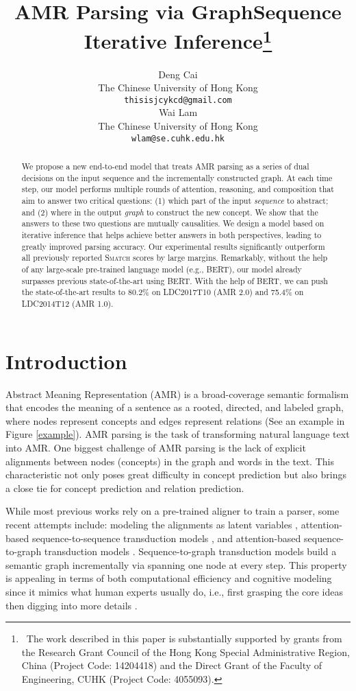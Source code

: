 \documentclass[11pt,a4paper]{article}
\title{AMR Parsing via Graph{\small }Sequence Iterative Inference\thanks{~The work described in this paper is substantially supported by grants from the Research Grant Council of the Hong Kong Special Administrative Region, China (Project Code: 14204418) and the Direct Grant of the Faculty of Engineering, CUHK (Project Code: 4055093).}}
\author{Deng Cai \\
	The Chinese University of Hong Kong\\
	{\tt thisisjcykcd@gmail.com} \\\And
	Wai Lam \\
	The Chinese University of Hong Kong\\
	{\tt wlam@se.cuhk.edu.hk} \\}
\date{}
\begin{document}
	\maketitle
	\begin{abstract}
		We propose a new end-to-end model that treats AMR parsing as a series of dual decisions on the input sequence and the incrementally constructed graph. At each time step, our model performs multiple rounds of attention, reasoning, and composition that aim to answer two critical questions: (1) which part of the input \textit{sequence} to abstract; and (2) where in the output \textit{graph} to construct the new concept. We show that the answers to these two questions are mutually causalities. We design a model based on iterative inference that helps achieve better answers in both perspectives, leading to greatly improved parsing accuracy. Our experimental results significantly outperform all previously reported \textsc{Smatch} scores by large margins. Remarkably, without the help of any large-scale pre-trained language model (e.g., BERT), our model already surpasses previous state-of-the-art using BERT. With the help of BERT, we can push the state-of-the-art results to 80.2\% on LDC2017T10 (AMR 2.0) and 75.4\% on LDC2014T12 (AMR 1.0).
	\end{abstract}
	\section{Introduction}
	Abstract Meaning Representation (AMR) \cite{banarescu2013abstract} is a broad-coverage semantic formalism that encodes the meaning of a sentence as a rooted, directed, and labeled graph, where nodes represent concepts and edges represent relations (See an example in Figure \ref{example}). AMR parsing is the task of transforming natural language text into AMR. One biggest challenge of AMR parsing is the lack of explicit alignments between nodes (concepts) in the graph and words in the text. This characteristic not only poses great difficulty in concept prediction but also brings a close tie for concept prediction and relation prediction.
	
	While most previous works rely on a pre-trained aligner to train a parser, some recent attempts include: modeling the alignments as latent variables \cite{lyu2018amr}, attention-based sequence-to-sequence transduction models \cite{barzdins2016riga,konstas2017neural,van2017neural}, and attention-based sequence-to-graph transduction models \cite{cai-lam-2019-core,zhang-etal-2019-broad}. Sequence-to-graph transduction models build a semantic graph incrementally via spanning one node at every step. This property is appealing in terms of both computational efficiency and cognitive modeling since it mimics what human experts usually do, i.e., first grasping the core ideas then digging into more details \cite{banarescu2013abstract,cai-lam-2019-core}.
	
\end{document}
